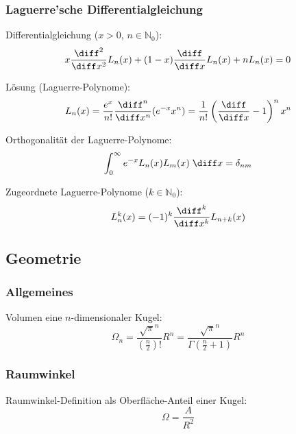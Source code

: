 \documentclass[11pt]{article}
\numberwithin{equation}{section}
\begin{document}
      \subsubsection{Laguerre'sche Differentialgleichung}
        Differentialgleichung ($x>0$, $n\in\mathbb{N}_0$):
        \begin{equation}
          x\frac{\diff^2}{\diff x^2}L_n(x) +(1-x)\tder{}{x}L_n(x) + nL_n(x) = 0
        \end{equation}

        Lösung (Laguerre-Polynome):
        \begin{equation}
          L_n(x) = \frac{e^x}{n!}\frac{\diff^n}{\diff x^n}(e^{-x} x^n) = \frac{1}{n!} \left(\tder{}{x}-1\right)^n x^n
        \end{equation}

        Orthogonalität der Laguerre-Polynome:
        \begin{equation}
          \int_0^\infty e^{-x} L_n(x) L_m(x)\;\diff x = \delta_{nm}
        \end{equation}

        Zugeordnete Laguerre-Polynome ($k\in\mathbb{N}_0$):
        \begin{equation}
          L_n^k(x) = (-1)^k\frac{\diff^k}{\diff x^k} L_{n+k}(x)
        \end{equation}

    \subsection{Geometrie}
      \subsubsection{Allgemeines}
        Volumen eine $n$-dimensionaler Kugel:
        \begin{equation}
          \Omega_n = \frac{\sqrt{\pi}^n}{\left(\frac{n}{2}\right)!}R^n
            = \frac{\sqrt{\pi}^n}{\Gamma\left(\frac{n}{2}+1\right)}R^n
        \end{equation}


      \subsubsection{Raumwinkel}
        Raumwinkel-Definition als Oberfläche-Anteil einer Kugel:
        \begin{equation}
          \Omega = \frac{A}{R^2}
        \end{equation}
\end{document}

